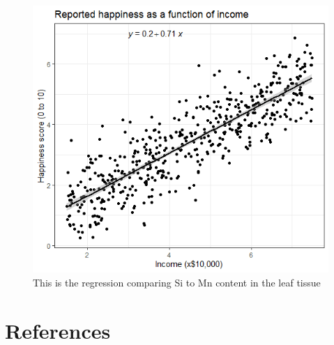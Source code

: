 \documentclass[12pt, letterpaper, ]{article}
\begin{document}
\begin{figure}[h]
        \includegraphics{images/si_mn_regression.png}
        \centering
        \caption{This is the regression comparing Si to Mn content in the leaf tissue}
        \label{Fig:mn_si_regression}
\end{figure}

\clearpage

\section{References}
\printbibliography
\end{document}
